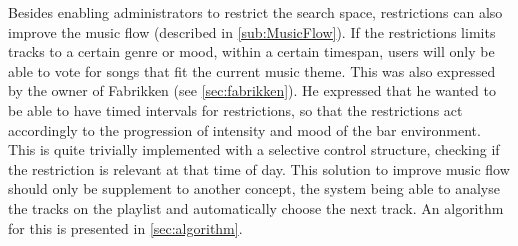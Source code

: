 Besides enabling administrators to restrict the search space, restrictions can also improve the music flow (described in \cref{sub:MusicFlow}). If the restrictions limits tracks to a certain genre or mood, within a certain timespan, users will only be able to vote for songs that fit the current music theme. This was also expressed by the owner of Fabrikken (see \cref{sec:fabrikken}). He expressed that he wanted to be able to have timed intervals for restrictions, so that the restrictions act accordingly to the progression of intensity and mood of the bar environment. This is quite trivially implemented with a selective control structure, checking if the restriction is relevant at that time of day. This solution to improve music flow should only be supplement to another concept, the system being able to analyse the tracks on the playlist and automatically choose the next track. An algorithm for this is presented in \cref{sec:algorithm}.